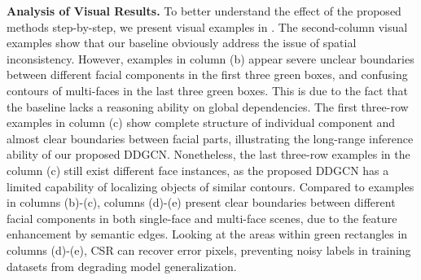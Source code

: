 \documentclass[10pt,twocolumn,letterpaper]{article}
\begin{document}
\noindent\textbf{Analysis of Visual Results.} To better understand the effect of the proposed methods step-by-step, we present visual examples in \figureautorefname{ \ref{fig:visualization}}.
The second-column visual examples show that our baseline obviously address the issue of spatial inconsistency. However, examples in column (b) appear severe unclear boundaries between different facial components in the first three green boxes, and confusing contours of multi-faces in the last three green boxes. This is due to the fact that the baseline lacks a reasoning ability on global dependencies. 
The first three-row examples in column (c) show complete structure of individual component and almost clear boundaries between facial parts, illustrating the long-range inference ability of our proposed DDGCN. Nonetheless, the last three-row examples in the column (c) still exist different face instances, as the proposed DDGCN has a limited capability of localizing objects of similar contours. 
Compared to examples in columns (b)-(c), columns (d)-(e) present clear boundaries between different facial components in both single-face and multi-face scenes, due to the feature enhancement by semantic edges. 
Looking at the areas within green rectangles in columns (d)-(e), CSR can recover error pixels, preventing noisy labels in training datasets from degrading model generalization.
\end{document}
